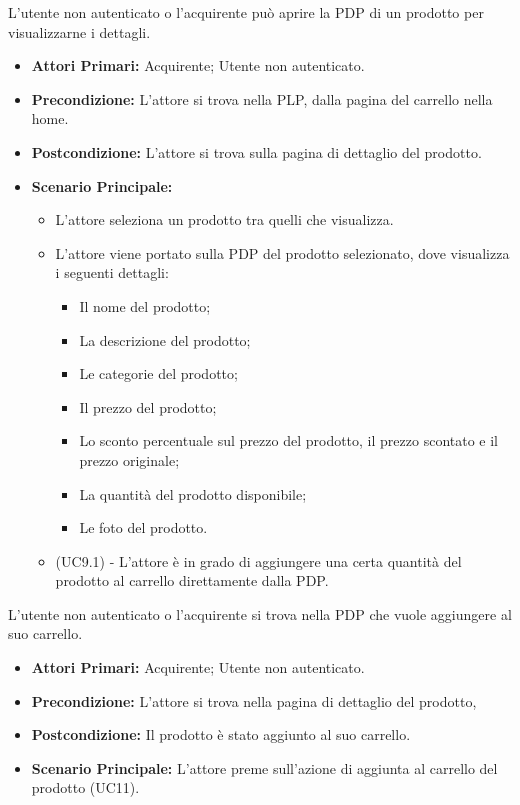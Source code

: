 
L'utente non autenticato o l'acquirente può aprire la PDP di un prodotto per visualizzarne i dettagli. 
\begin{itemize}
    \item \textbf{Attori Primari:} Acquirente; Utente non autenticato.
    \item \textbf{Precondizione:} L'attore si trova nella PLP, dalla pagina del carrello nella home.
    \item \textbf{Postcondizione:} L'attore si trova sulla pagina di dettaglio del prodotto.
    \item \textbf{Scenario Principale:}
        \begin{itemize}
            \item L'attore seleziona un prodotto tra quelli che visualizza.
            \item L'attore viene portato sulla PDP del prodotto selezionato, dove visualizza i seguenti dettagli:
            \begin{itemize}
                \item Il nome del prodotto;
                \item La descrizione del prodotto;
                \item Le categorie del prodotto;
                \item Il prezzo del prodotto;
                \item Lo sconto percentuale sul prezzo del prodotto, il prezzo scontato e il prezzo originale;
                \item La quantità del prodotto disponibile;
                \item Le foto del prodotto.
            \end{itemize}
            \item (UC9.1) - L'attore è in grado di aggiungere una certa quantità del prodotto al carrello direttamente dalla PDP. 
        \end{itemize}
\end{itemize}

L'utente non autenticato o l'acquirente si trova nella PDP che vuole aggiungere al suo carrello.
\begin{itemize}
    \item \textbf{Attori Primari:} Acquirente; Utente non autenticato.
    \item \textbf{Precondizione:} L'attore si trova nella pagina di dettaglio del prodotto,
    \item \textbf{Postcondizione:} Il prodotto è stato aggiunto al suo carrello.
    \item \textbf{Scenario Principale:} L'attore preme sull'azione di aggiunta al carrello del prodotto (UC11).
\end{itemize}
